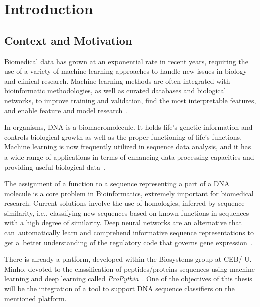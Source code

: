 \newcommand{\novathesis}{\emph{novathesis}}
\newcommand{\novathesisclass}{\texttt{novathesis.cls}}


\chapter{Introduction}
\label{cha:introduction}

\section{Context and Motivation} \label{sec:context_and_motivation}

Biomedical data has grown at an exponential rate in recent years, requiring the use of a variety of machine learning approaches to handle new issues in biology and clinical research. Machine learning methods are often integrated with bioinformatic methodologies, as well as curated databases and biological networks, to improve training and validation, find the most interpretable features, and enable feature and model research~\cite{Auslander2021IncorporatingFrameworks}.

In organisms, DNA is a biomacromolecule. It holds life's genetic information and controls biological growth as well as the proper functioning of life's functions. Machine learning is now frequently utilized in sequence data analysis, and it has a wide range of applications in terms of enhancing data processing capacities and providing useful biological data~\cite{Yang2020ReviewDNA}.

The assignment of a function to a sequence representing a part of a DNA molecule is a core problem in Bioinformatics, extremely important for biomedical research. Current solutions involve the use of homologies, inferred by sequence similarity, i.e., classifying new sequences based on known functions in sequences with a high degree of similarity. Deep neural networks are an alternative that can automatically learn and comprehend informative sequence representations to get a better understanding of the regulatory code that governs gene expression~\cite{Zrimec2021LearningExpression}.

There is already a platform, developed within the Biosystems group at CEB/ U. Minho, devoted to the classification of peptides/proteins sequences using machine learning and deep learning called \textit{ProPythia}~\cite{Sequeira2020ProPythia:Learning}. One of the objectives of this thesis will be the integration of a tool to support DNA sequence classifiers on the mentioned platform.

